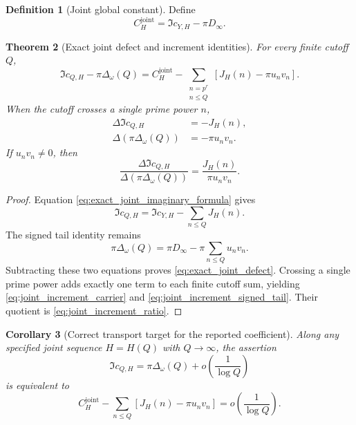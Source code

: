 \documentclass[11pt]{amsart}
\numberwithin{equation}{section}
\theoremstyle{plain}
\newtheorem{theorem}{Theorem}[section]
\newtheorem{corollary}[theorem]{Corollary}
\theoremstyle{definition}
\newtheorem{definition}[theorem]{Definition}
\theoremstyle{remark}
\newcommand{\1}{\mathbf{1}}
\begin{document}
\begin{definition}[Joint global constant]
\label{def:joint_global_constant}
Define
\begin{equation}
C_H^{\mathrm{joint}}
=
\Im c_{Y,H}-\pi D_\infty.
\label{eq:joint_global_constant}
\end{equation}
\end{definition}

\begin{theorem}[Exact joint defect and increment identities]
\label{thm:exact_joint_defect_increment}
For every finite cutoff \(Q\),
\begin{equation}
\boxed{
\Im c_{Q,H}-\pi\Delta_\omega(Q)
=
C_H^{\mathrm{joint}}
-
\sum_{\substack{n=p^r\\n\leq Q}}
\left[J_H(n)-\pi u_nv_n\right].
}
\label{eq:exact_joint_defect}
\end{equation}
When the cutoff crosses a single prime power \(n\),
\begin{align}
\Delta\Im c_{Q,H}
&=
-J_H(n),
\label{eq:joint_increment_carrier}
\\
\Delta\!\left(\pi\Delta_\omega(Q)\right)
&=
-\pi u_nv_n.
\label{eq:joint_increment_signed_tail}
\end{align}
If \(u_nv_n\neq0\), then
\begin{equation}
\boxed{
\frac{
\Delta\Im c_{Q,H}
}{
\Delta(\pi\Delta_\omega(Q))
}
=
\frac{J_H(n)}{\pi u_nv_n}.
}
\label{eq:joint_increment_ratio}
\end{equation}
\end{theorem}

\begin{proof}
Equation \eqref{eq:exact_joint_imaginary_formula} gives
\begin{equation}
\Im c_{Q,H}
=
\Im c_{Y,H}-\sum_{n\leq Q}J_H(n).
\label{eq:joint_defect_first_identity}
\end{equation}
The signed tail identity remains
\begin{equation}
\pi\Delta_\omega(Q)
=
\pi D_\infty-\pi\sum_{n\leq Q}u_nv_n.
\label{eq:joint_defect_second_identity}
\end{equation}
Subtracting these two equations proves
\eqref{eq:exact_joint_defect}.  Crossing a single prime power adds exactly
one term to each finite cutoff sum, yielding
\eqref{eq:joint_increment_carrier} and
\eqref{eq:joint_increment_signed_tail}.  Their quotient is
\eqref{eq:joint_increment_ratio}.
\end{proof}

\begin{corollary}[Correct transport target for the reported coefficient]
\label{cor:joint_transport_target}
Along any specified joint sequence \(H=H(Q)\) with \(Q\to\infty\), the
assertion
\begin{equation}
\Im c_{Q,H}
=
\pi\Delta_\omega(Q)
+
o\!\left(\frac1{\log Q}\right)
\label{eq:joint_transport_relation}
\end{equation}
is equivalent to
\begin{equation}
\boxed{
C_H^{\mathrm{joint}}
-
\sum_{n\leq Q}
\left[J_H(n)-\pi u_nv_n\right]
=
o\!\left(\frac1{\log Q}\right).
}
\label{eq:joint_transport_equivalent_target}
\end{equation}
\end{corollary}
\end{document}
